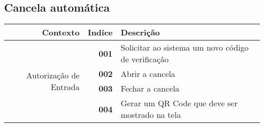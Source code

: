 \documentclass[a4paper,12pt]{article}
\begin{document}
\subsection{Cancela automática}

\begin{table}[H]
    \begin{tabularx}{\linewidth}{ | r | r | X | }
        \hline
        \bf{Contexto} &\bf{Indíce}& \bf{Descrição} \\
        \hline
        \multirow{4}{7.5em}{Autorização de Entrada}  
            & \bf{001} & Solicitar ao sistema um novo código de verificação \\ \cline{2-3}
            & \bf{002} & Abrir a cancela \\ \cline{2-3}
            & \bf{003} & Fechar a cancela \\ \cline{2-3}
            & \bf{004} & Gerar um QR Code que deve ser mostrado na tela \\ 
        \hline
    \end{tabularx}
\end{table}







\end{document}
